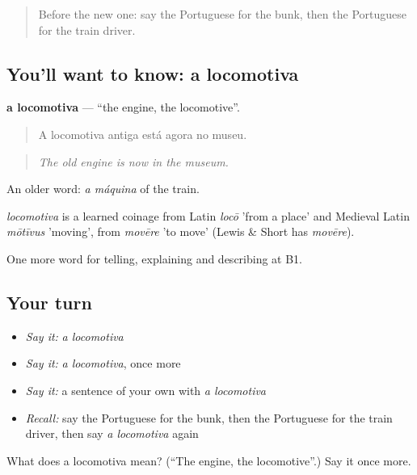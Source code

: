 \label{lesson:PT-C415-locomotiva}



\begin{quote}
Before the new one: say the Portuguese for the bunk, then the Portuguese for the train driver.
\end{quote}

\subsection*{You'll want to know: a locomotiva}
\textbf{a locomotiva} — \textquotedblleft{}the engine, the locomotive\textquotedblright{}.

\begin{quote}
A locomotiva antiga está agora no museu.
\end{quote}

\begin{quote}
\emph{The old engine is now in the museum.}
\end{quote}

An older word: \emph{a máquina} of the train.

\begin{cousinweb}
\emph{locomotiva} is a learned coinage from Latin \emph{locō} 'from a place' and Medieval Latin \emph{mōtīvus} 'moving', from \emph{movēre} 'to move' (Lewis \& Short has \emph{movēre}).
\end{cousinweb}

\begin{grammarlens}[title={What you've built}]
One more word for telling, explaining and describing at B1.
\end{grammarlens}

\subsection*{Your turn}
\begin{itemize}
\raggedright
  \item \emph{Say it:} \emph{a locomotiva}
  \item \emph{Say it:} \emph{a locomotiva}, once more
  \item \emph{Say it:} a sentence of your own with \emph{a locomotiva}
  \item \emph{Recall:} say the Portuguese for the bunk, then the Portuguese for the train driver, then say \emph{a locomotiva} again
\end{itemize}

\begin{tcolorbox}[breakable,colback=teal!4,colframe=teal!35!black,title={Before you move on}]
What does a locomotiva mean? (\textquotedblleft{}The engine, the locomotive\textquotedblright{}.) Say it once more.
\end{tcolorbox}
